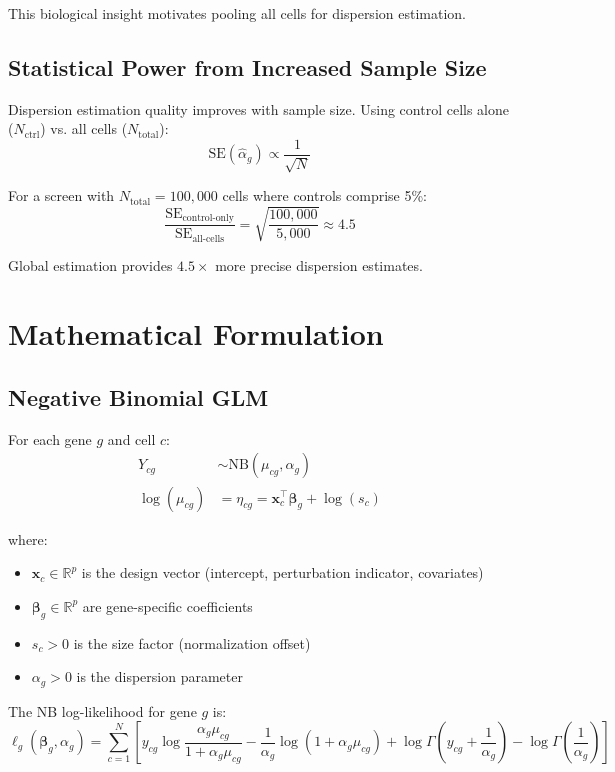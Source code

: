 \documentclass[11pt]{article}
\theoremstyle{definition}
\theoremstyle{remark}
\begin{document}
This biological insight motivates pooling all cells for dispersion estimation.

\subsection{Statistical Power from Increased Sample Size}

Dispersion estimation quality improves with sample size. Using control cells alone ($N_{\text{ctrl}}$) vs. all cells ($N_{\text{total}}$):
\[
\text{SE}(\hat{\alpha}_g) \propto \frac{1}{\sqrt{N}}
\]

For a screen with $N_{\text{total}} = 100{,}000$ cells where controls comprise 5\%:
\[
\frac{\text{SE}_{\text{control-only}}}{\text{SE}_{\text{all-cells}}} = \sqrt{\frac{100{,}000}{5{,}000}} \approx 4.5
\]

Global estimation provides $4.5\times$ more precise dispersion estimates.

\section{Mathematical Formulation}

\subsection{Negative Binomial GLM}

For each gene $g$ and cell $c$:
\begin{align}
Y_{cg} &\sim \text{NB}(\mu_{cg}, \alpha_g) \\
\log(\mu_{cg}) &= \eta_{cg} = \mathbf{x}_c^\top \boldsymbol{\beta}_g + \log(s_c)
\end{align}

where:
\begin{itemize}
    \item $\mathbf{x}_c \in \mathbb{R}^p$ is the design vector (intercept, perturbation indicator, covariates)
    \item $\boldsymbol{\beta}_g \in \mathbb{R}^p$ are gene-specific coefficients
    \item $s_c > 0$ is the size factor (normalization offset)
    \item $\alpha_g > 0$ is the dispersion parameter
\end{itemize}

The NB log-likelihood for gene $g$ is:
\begin{equation}
\ell_g(\boldsymbol{\beta}_g, \alpha_g) = \sum_{c=1}^{N} \left[ y_{cg} \log\frac{\alpha_g \mu_{cg}}{1 + \alpha_g \mu_{cg}} - \frac{1}{\alpha_g}\log(1 + \alpha_g \mu_{cg}) + \log\Gamma\left(y_{cg} + \frac{1}{\alpha_g}\right) - \log\Gamma\left(\frac{1}{\alpha_g}\right) \right]
\end{equation}
\end{document}
